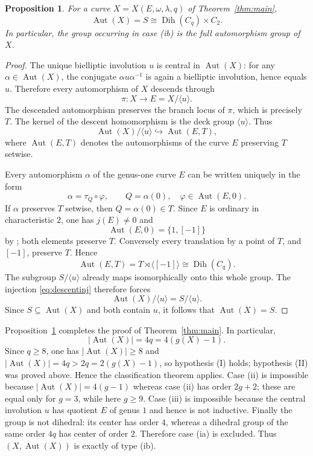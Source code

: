 \documentclass[11pt]{article}
\newtheorem{proposition}[theorem]{Proposition}
\theoremstyle{remark}
\newcommand{\Aut}{\operatorname{Aut}}
\newcommand{\Dih}{\operatorname{Dih}}
\begin{document}
\begin{proposition}\label{prop:fullaut}
For a curve $X=X(E,\omega,\lambda,q)$ of Theorem~\ref{thm:main},
\[
 \Aut(X)=S\cong \Dih(C_q)\times C_2.
\]
In particular, the group occurring in case \textup{(ib)} is the full
automorphism group of $X$.
\end{proposition}

\begin{proof}
The unique bielliptic involution $u$ is central in $\Aut(X)$: for any
$\alpha\in\Aut(X)$, the conjugate $\alpha u\alpha^{-1}$ is again a
bielliptic involution, hence equals $u$.  Therefore every automorphism of
$X$ descends through
\[
 \pi:X\longrightarrow E=X/\langle u\rangle.
\]
The descended automorphism preserves the branch locus of $\pi$, which is
precisely $T$.  The kernel of the descent homomorphism is the deck group
$\langle u\rangle$.  Thus
\begin{equation}\label{eq:descentinj}
 \Aut(X)/\langle u\rangle\hookrightarrow \Aut(E,T),
\end{equation}
where $\Aut(E,T)$ denotes the automorphisms of the curve $E$ preserving
$T$ setwise.

Every automorphism $\alpha$ of the genus-one curve $E$ can be written
uniquely in the form
\[
 \alpha=\tau_Q\circ\varphi,
 \qquad Q=\alpha(0),\quad \varphi\in\Aut(E,0).
\]
If $\alpha$ preserves $T$ setwise, then $Q=\alpha(0)\in T$.  Since $E$
is ordinary in characteristic $2$, one has $j(E)\ne0$ and
\[
 \Aut(E,0)=\{1,[-1]\}
\]
by \cite[Theorem~III.10.1]{Silverman}; both elements preserve
$T$.  Conversely every translation by a point of $T$, and $[-1]$, preserve
$T$.  Hence
\[
 \Aut(E,T)=T\rtimes\langle[-1]\rangle
 \cong\Dih(C_q).
\]
The subgroup $S/\langle u\rangle$ already maps isomorphically onto this
whole group.  The injection \eqref{eq:descentinj} therefore forces
\[
 \Aut(X)/\langle u\rangle=S/\langle u\rangle.
\]
Since $S\subseteq\Aut(X)$ and both contain $u$, it follows that
$\Aut(X)=S$.
\end{proof}

Proposition~\ref{prop:fullaut} completes the proof of Theorem~\ref{thm:main}.  In particular,
\[
 |\Aut(X)|=4q=4(g(X)-1).
\]
Since $q\ge8$, one has $|\Aut(X)|\ge8$ and
$|\Aut(X)|=4q>2q=2(g(X)-1)$, so hypothesis \textup{(I)} holds; hypothesis
\textup{(II)} was proved above.  Hence the classification theorem applies.  Case \textup{(ii)} is
impossible because $|\Aut(X)|=4(g-1)$ whereas case \textup{(ii)} has
order $2g+2$; these are equal only for $g=3$, while here $g\ge9$.
Case \textup{(iii)} is impossible because the central involution $u$
has quotient $E$ of genus $1$ and hence is not inductive.  Finally the group is not dihedral: its center has order $4$, whereas
a dihedral group of the same order $4q$ has center of order $2$.
Therefore case \textup{(ia)} is excluded.  Thus
$(X,\Aut(X))$ is exactly of type \textup{(ib)}.
\end{document}
